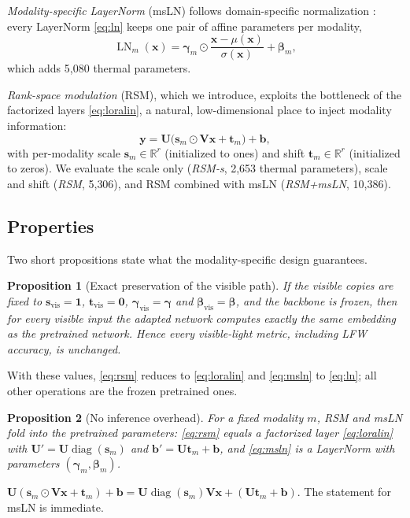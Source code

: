 \documentclass[journal]{IEEEtran}
\newtheorem{proposition}{Proposition}
\newcommand{\R}{\mathbb{R}}
\newcommand{\vect}[1]{\bm{#1}}
\newcommand{\vis}{\text{vis}}
\newcommand{\LN}{\operatorname{LN}}
\begin{document}
\emph{Modality-specific LayerNorm} (msLN) follows domain-specific normalization \cite{chang2019dsbn}: every LayerNorm \eqref{eq:ln} keeps one pair of affine parameters per modality,
\begin{equation}
  \LN_m(\vect{x}) = \vect{\gamma}_m\odot\frac{\vect{x}-\mu(\vect{x})}{\sigma(\vect{x})} + \vect{\beta}_m,
  \label{eq:msln}
\end{equation}
which adds 5{,}080 thermal parameters.

\emph{Rank-space modulation} (RSM), which we introduce, exploits the bottleneck of the factorized layers \eqref{eq:loralin}, a natural, low-dimensional place to inject modality information:
\begin{equation}
  \vect{y} = \vect{U}\big(\vect{s}_m \odot \vect{V}\vect{x} + \vect{t}_m\big) + \vect{b},
  \label{eq:rsm}
\end{equation}
with per-modality scale $\vect{s}_m\in\R^r$ (initialized to ones) and shift $\vect{t}_m\in\R^r$ (initialized to zeros). We evaluate the scale only (\emph{RSM-s}, 2{,}653 thermal parameters), scale and shift (\emph{RSM}, 5{,}306), and RSM combined with msLN (\emph{RSM+msLN}, 10{,}386).

\subsection{Properties}
\label{sec:props}
Two short propositions state what the modality-specific design guarantees.

\begin{proposition}[Exact preservation of the visible path]
\label{prop:preserve}
If the visible copies are fixed to $\vect{s}_\vis=\vect{1}$, $\vect{t}_\vis=\vect{0}$, $\vect{\gamma}_\vis=\vect{\gamma}$ and $\vect{\beta}_\vis=\vect{\beta}$, and the backbone is frozen, then for every visible input the adapted network computes exactly the same embedding as the pretrained network. Hence every visible-light metric, including LFW accuracy, is unchanged.
\end{proposition}
\begin{IEEEproof}
With these values, \eqref{eq:rsm} reduces to \eqref{eq:loralin} and \eqref{eq:msln} to \eqref{eq:ln}; all other operations are the frozen pretrained ones.
\end{IEEEproof}

\begin{proposition}[No inference overhead]
\label{prop:fold}
For a fixed modality $m$, RSM and msLN fold into the pretrained parameters: \eqref{eq:rsm} equals a factorized layer \eqref{eq:loralin} with $\vect{U}'=\vect{U}\operatorname{diag}(\vect{s}_m)$ and $\vect{b}'=\vect{U}\vect{t}_m+\vect{b}$, and \eqref{eq:msln} is a LayerNorm with parameters $(\vect{\gamma}_m,\vect{\beta}_m)$.
\end{proposition}
\begin{IEEEproof}
$\vect{U}(\vect{s}_m\odot\vect{V}\vect{x}+\vect{t}_m)+\vect{b} = \vect{U}\operatorname{diag}(\vect{s}_m)\vect{V}\vect{x} + (\vect{U}\vect{t}_m+\vect{b})$. The statement for msLN is immediate.
\end{IEEEproof}
\end{document}
